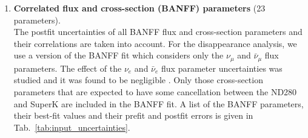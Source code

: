 \begin{enumerate}
\item 
{\bf Correlated flux and cross-section (BANFF) parameters} (23 parameters).\\
The postfit uncertainties of all BANFF flux and cross-section parameters and their correlations are taken into account.
For the disappearance analysis, we use a version of the BANFF fit which considers
only the $\nu_\mu$ and $\bar{\nu}_{\mu}$ flux parameters. The effect of the $\nu_{e}$ and $\bar{\nu}_{e}$ 
flux parameter uncertainties was studied and it was found to be negligible \cite{OurRun123DisappAnalysis3Flavour}.
Only those cross-section parameters that are expected to have some cancellation between the ND280 and SuperK are included in the BANFF fit.
A list of the BANFF parameters, their best-fit values and their prefit and postfit errors is given in Tab.\ \ref{tab:input_uncertainties}.


\end{enumerate}
